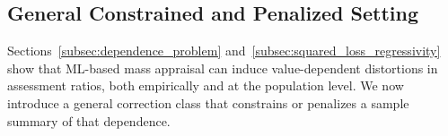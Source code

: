 \documentclass[12pt]{article}
\theoremstyle{plain}
\theoremstyle{definition}
\newcommand{\1}{\mathbf{1}}
\newcommand{\Cov}{\text{Cov}}
\begin{document}






\subsection{General Constrained and Penalized Setting}
\label{subsec:general_penalized_setting}

Sections~\ref{subsec:dependence_problem} and~\ref{subsec:squared_loss_regressivity} show that ML-based mass appraisal can induce value-dependent distortions in assessment ratios, both empirically and at the population level. We now introduce a general correction class that constrains or penalizes a sample summary of that dependence.
\end{document}
